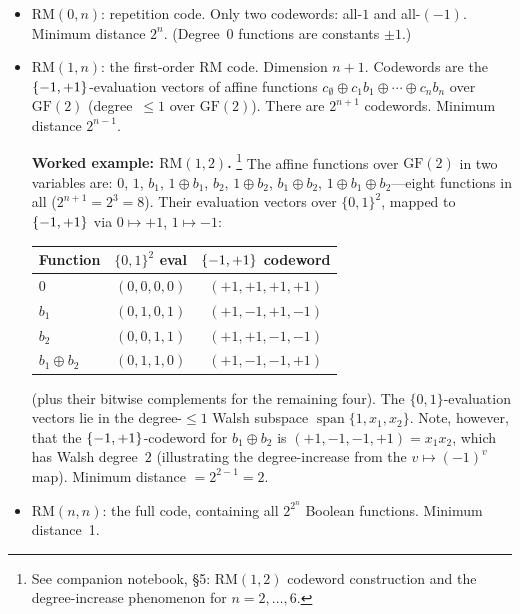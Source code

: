 \begin{example}\label{ex:rm-small}
\begin{itemize}
  \item $\text{RM}(0, n)$: repetition code. Only two codewords: all-$1$
    and all-$(-1)$. Minimum distance $2^n$. (Degree~0 functions are
    constants $\pm 1$.)
  \item $\text{RM}(1, n)$: the first-order RM code. Dimension $n + 1$.
    Codewords are the $\{-1,+1\}$-evaluation vectors of affine functions
    $c_\emptyset \oplus c_1 b_1 \oplus \cdots \oplus c_n b_n$ over
    $\text{GF}(2)$ (degree~$\leq 1$ over $\text{GF}(2)$).
    There are $2^{n+1}$ codewords. Minimum distance $2^{n-1}$.

    \textbf{Worked example: $\text{RM}(1, 2)$.}%
    \footnote{See companion notebook, \S5: RM$(1,2)$ codeword
    construction and the degree-increase phenomenon for
    $n = 2, \ldots, 6$.}
    The affine functions over $\text{GF}(2)$ in two variables are:
    $0$, $1$, $b_1$, $1 \oplus b_1$, $b_2$, $1 \oplus b_2$,
    $b_1 \oplus b_2$, $1 \oplus b_1 \oplus b_2$---eight functions in
    all ($2^{n+1} = 2^3 = 8$). Their evaluation vectors over
    $\{0,1\}^2$, mapped to $\{-1,+1\}$ via $0 \mapsto +1$, $1 \mapsto -1$:
    \begin{center}
    \begin{tabular}{lcc}
    \toprule
    Function & $\{0,1\}^2$ eval & $\{-1,+1\}$ codeword \\
    \midrule
    $0$               & $(0,0,0,0)$ & $(+1,+1,+1,+1)$ \\
    $b_1$             & $(0,1,0,1)$ & $(+1,-1,+1,-1)$ \\
    $b_2$             & $(0,0,1,1)$ & $(+1,+1,-1,-1)$ \\
    $b_1 \oplus b_2$  & $(0,1,1,0)$ & $(+1,-1,-1,+1)$ \\
    \bottomrule
    \end{tabular}
    \end{center}
    (plus their bitwise complements for the remaining four).
    The $\{0,1\}$-evaluation vectors lie in the degree-$\leq 1$ Walsh
    subspace $\operatorname{span}\{1, x_1, x_2\}$.
    Note, however, that the $\{-1,+1\}$-codeword for $b_1 \oplus b_2$ is
    $(+1,-1,-1,+1) = x_1 x_2$, which has Walsh degree~$2$
    (illustrating the degree-increase from the $v \mapsto (-1)^v$ map).
    Minimum distance $= 2^{2-1} = 2$.
  \item $\text{RM}(n, n)$: the full code, containing all $2^{2^n}$
    Boolean functions. Minimum distance~1.
\end{itemize}
\end{example}


